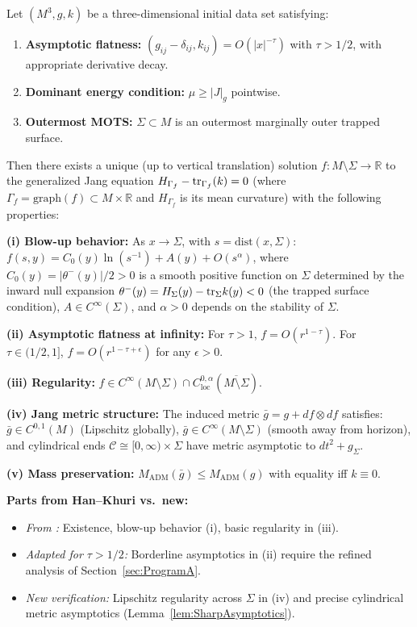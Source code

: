 \begin{theorem}\label{thm:HanKhuri}
Let $(M^3, g, k)$ be a three-dimensional initial data set satisfying:
\begin{enumerate}
    \item[\textup{(H1)}] \textbf{Asymptotic flatness:} $(g_{ij} - \delta_{ij}, k_{ij}) = O(|x|^{-\tau})$ with $\tau > 1/2$, with appropriate derivative decay.
    \item[\textup{(H2)}] \textbf{Dominant energy condition:} $\mu \ge |J|_g$ pointwise.
    \item[\textup{(H3)}] \textbf{Outermost MOTS:} $\Sigma \subset M$ is an outermost marginally outer trapped surface.
\end{enumerate}

Then there exists a unique (up to vertical translation) solution $f: M \setminus \Sigma \to \mathbb{R}$ to the generalized Jang equation
$H_{\Gamma_f} - \mathrm{tr}_{\Gamma_f}(k) = 0$
(where $\Gamma_f = \mathrm{graph}(f) \subset M \times \mathbb{R}$ and $H_{\Gamma_f}$ is its mean curvature) with the following properties:

\textbf{(i) Blow-up behavior:} As $x \to \Sigma$, with $s = \mathrm{dist}(x, \Sigma)$:
$f(s, y) = C_0(y) \ln(s^{-1}) + A(y) + O(s^\alpha)$, where $C_0(y) = |\theta^-(y)|/2 > 0$ is a smooth positive function on $\Sigma$ determined by the inward null expansion $\theta^-(y) = H_\Sigma(y) - \mathrm{tr}_\Sigma k(y) < 0$ (the trapped surface condition), $A \in C^\infty(\Sigma)$, and $\alpha > 0$ depends on the stability of $\Sigma$.

\textbf{(ii) Asymptotic flatness at infinity:} For $\tau > 1$, $f = O(r^{1-\tau})$. For $\tau \in (1/2, 1]$, $f = O(r^{1-\tau+\epsilon})$ for any $\epsilon > 0$.

\textbf{(iii) Regularity:} $f \in C^\infty(M \setminus \Sigma) \cap C^{0,\alpha}_{\mathrm{loc}}(\overline{M \setminus \Sigma})$.

\textbf{(iv) Jang metric structure:} The induced metric $\bar{g} = g + df \otimes df$ satisfies: $\bar{g} \in C^{0,1}(M)$ (Lipschitz globally), $\bar{g} \in C^\infty(M \setminus \Sigma)$ (smooth away from horizon), and cylindrical ends $\mathcal{C} \cong [0,\infty) \times \Sigma$ have metric asymptotic to $dt^2 + g_\Sigma$.

\textbf{(v) Mass preservation:} $M_{\mathrm{ADM}}(\bar{g}) \le M_{\mathrm{ADM}}(g)$ with equality iff $k \equiv 0$.

\noindent\textbf{Parts from Han--Khuri vs.\ new:}
\begin{itemize}
    \item \textit{From \cite{hankhuri2013}:} Existence, blow-up behavior (i), basic regularity in (iii).
    \item \textit{Adapted for $\tau > 1/2$:} Borderline asymptotics in (ii) require the refined analysis of Section~\ref{sec:ProgramA}.
    \item \textit{New verification:} Lipschitz regularity across $\Sigma$ in (iv) and precise cylindrical metric asymptotics (Lemma~\ref{lem:SharpAsymptotics}).
\end{itemize}


\end{theorem}
